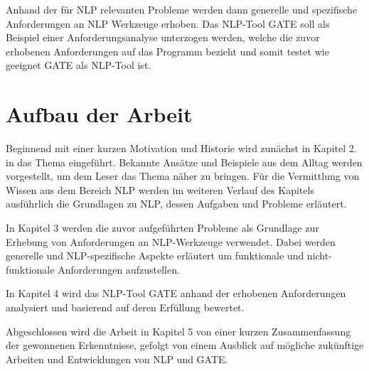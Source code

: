 \documentclass[12pt]{report}
\begin{document}
Anhand der für NLP relevanten Probleme werden dann generelle und spezifische Anforderungen an NLP Werkzeuge erhoben. 
Das NLP-Tool GATE soll als Beispiel einer Anforderungsanalyse unterzogen werden, welche die zuvor erhobenen Anforderungen auf das Programm bezieht und somit testet wie geeignet GATE als NLP-Tool ist.

\section{Aufbau der Arbeit}
Beginnend mit einer kurzen Motivation und Historie wird zunächst in Kapitel 2. in das Thema eingeführt. Bekannte Ansätze und Beispiele aus dem Alltag werden vorgestellt, um dem Leser das Thema näher zu bringen. Für die Vermittlung von Wissen aus dem Bereich NLP werden im weiteren Verlauf des Kapitels ausführlich die Grundlagen zu NLP, dessen Aufgaben und Probleme erläutert.

In Kapitel 3 werden die zuvor aufgeführten Probleme als Grundlage zur Erhebung von Anforderungen an NLP-Werkzeuge verwendet. Dabei werden generelle und NLP-spezifische Aspekte erläutert um funktionale und nicht-funktionale Anforderungen aufzustellen.

In Kapitel 4 wird das NLP-Tool GATE anhand der erhobenen Anforderungen analysiert und basierend auf deren Erfüllung bewertet. 

Abgeschlossen wird die Arbeit in Kapitel 5 von einer kurzen Zusammenfassung der gewonnenen Erkenntnisse, gefolgt von einem Ausblick auf mögliche zukünftige Arbeiten und Entwicklungen von NLP und GATE. 
\end{document}
